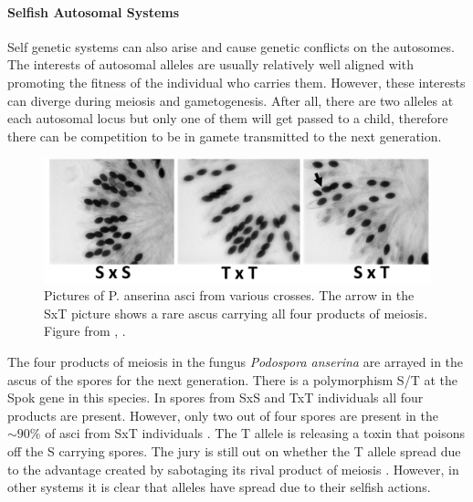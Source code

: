 {\paragraph{Selfish Autosomal Systems}
Self genetic systems can also arise and cause genetic conflicts on the
autosomes. The interests of autosomal alleles are usually relatively
well aligned with promoting the fitness of the individual who carries them. However, these interests can
diverge during meiosis and gametogenesis. After all, there are two
alleles at each autosomal locus but only one of them will get passed
to a child, therefore there can be competition to be in gamete transmitted to the next generation.
 \begin{figure}
\begin{center}
\includegraphics[width= \textwidth]{Journal_figs/single_locus_selection/ascus_spore_killer/Grognet_spore_killer.png}
\end{center}
\caption{
Pictures of P. anserina asci from various crosses. The arrow in the
SxT picture shows a rare  ascus carrying all four products of
meiosis. Figure from \citet{grognet2014genes}, \PLOSccBY. 
 } \label{fig:spore_killer}
\end{figure}
  

The four products of meiosis in the fungus {\it Podospora anserina}
are arrayed in the ascus
of the spores for the next generation. There is a polymorphism S/T at
the Spok gene in this species. In
spores from SxS and TxT individuals all four products are
present. However, only two out of four spores are present in the
$\sim 90\%$ of asci from SxT individuals \citep{grognet2014genes}. The T allele is releasing
a toxin that poisons off the S carrying spores. The jury is still out
on whether the T allele spread due to the advantage created by
sabotaging its rival product of meiosis \citep{sweigart2019making}. However, in other systems it
is clear that alleles have spread due to their selfish actions. 

}
